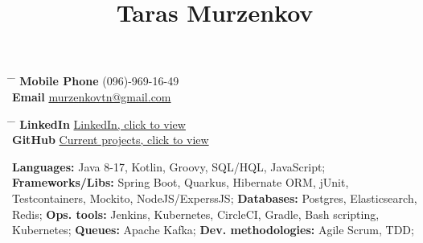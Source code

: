 \documentclass[10pt]{article} %
\begin{document}


\title{Taras Murzenkov } %


\parbox{0.2\textwidth}{ %
\begin{tabbing} %
\hspace{3cm} \= \hspace{4cm} \= \kill %
{\bf Mobile Phone} \> (096)-969-16-49\\ %
{\bf Email} \> \href{mailto:murzenkovtn@gmail.com}{murzenkovtn@gmail.com} \\ %

\end{tabbing}}
\hfill %
\parbox{0.5\textwidth}{ %
\begin{tabbing} %
\hspace{3cm} \= \hspace{4cm} \= \kill %
{\bf LinkedIn} \> \href{https://www.linkedin.com/in/tarasmurzenkov}{LinkedIn, click to view} \\ %
{\bf GitHub} \> \href{https://github.com/tarasmurzenkovv/}{Current projects, click to view}\\ %

\end{tabbing}}

{
\textbf{Languages:} Java 8-17, Kotlin, Groovy, SQL/HQL, JavaScript; \newline
\textbf{Frameworks/Libs:} Spring Boot, Quarkus, Hibernate ORM, jUnit, Testcontainers, Mockito, NodeJS/ExperssJS; \newline
\textbf{Databases:}  Postgres, Elasticsearch, Redis; \newline
\textbf{Ops. tools:} Jenkins, Kubernetes, CircleCI, Gradle, Bash scripting, Kubernetes; \newline
\textbf{Queues:} Apache Kafka; \newline
\textbf{Dev. methodologies:} Agile Scrum, TDD;
}
\end{document}
